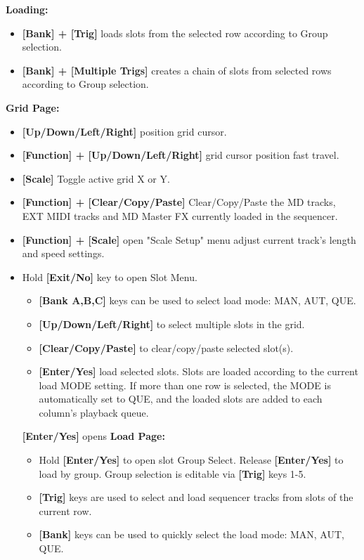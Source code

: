 \textbf{Loading:}
   \begin{itemize}
      \item \textbf{[Bank] + [Trig]} loads slots from the selected row according to Group selection.
      \item \textbf{[Bank] + [Multiple Trigs]} creates a chain of slots from selected rows according to Group selection.
   \end{itemize}

\textbf{Grid Page:}
    \begin{itemize}
      \item \textbf{[Up/Down/Left/Right]} position grid cursor. 
      \item \textbf{[Function] + [Up/Down/Left/Right]} grid cursor position fast travel.
      \item \textbf{[Scale]} Toggle active grid X or Y. 
      \item \textbf{[Function] + [Clear/Copy/Paste]} Clear/Copy/Paste  the MD tracks, EXT MIDI tracks and MD Master FX currently loaded in the sequencer.
      \item \textbf{[Function] + [Scale]} open "Scale Setup" menu adjust current track's length and speed settings.
      \item Hold \textbf{[Exit/No]} key to open Slot Menu.
      \begin{itemize}
                \item \textbf{[Bank A,B,C]} keys can be used to select load mode: MAN, AUT, QUE.
                \item \textbf{[Up/Down/Left/Right]} to select multiple slots in the grid.
                \item \textbf{[Clear/Copy/Paste]} to clear/copy/paste selected slot(s).
                \item \textbf{[Enter/Yes]} load selected slots. Slots are loaded according to the current load MODE setting. If more than one row is selected, the MODE is automatically set to QUE, and the loaded slots are added to each column's playback queue.                
      \end{itemize}

\textbf{[Enter/Yes]} opens \textbf{Load Page:}
    \begin{itemize}
    \item Hold \textbf{[Enter/Yes]} to open slot Group Select. Release \textbf{[Enter/Yes]} to load by group. Group selection is editable via \textbf{[Trig]} keys 1-5.
    \item \textbf{[Trig]} keys are used to select and load sequencer tracks from slots of the current row.
    \item \textbf{[Bank]} keys can be used to quickly select the load mode: MAN, AUT, QUE.
    \end{itemize}
    

\end{itemize}
